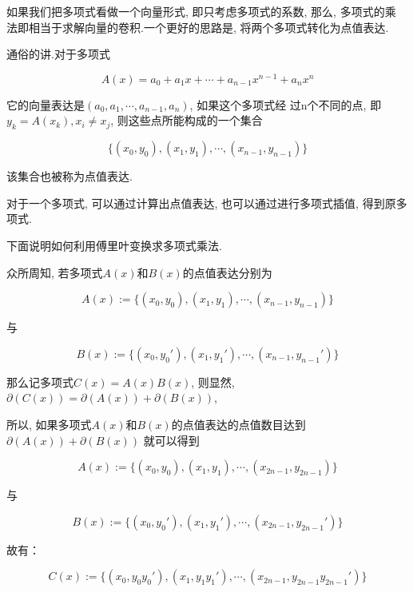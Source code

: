 如果我们把多项式看做一个向量形式, 即只考虑多项式的系数, 那么, 多项式的乘
法即相当于求解向量的卷积.一个更好的思路是, 将两个多项式转化为点值表达.

通俗的讲.对于多项式

\begin{equation}
A(x) = a_{0} + a_{1}x + \cdots + a_{n-1}x^{n-1} + a_{n}x^{n}
\end{equation}

它的向量表达是$(a_{0},  a_{1}, \cdots , a_{n-1}, a_{n})$, 如果这个多项式经
过n个不同的点, 即$y_k = A(x_k), x_i \neq x_j$, 则这些点所能构成的一个集合

\begin{equation}
\{(x_0, y_0), (x_1, y_1), \cdots , (x_{n - 1}, y_{n - 1})\}
\end{equation}

该集合也被称为点值表达.

对于一个多项式, 可以通过计算出点值表达, 也可以通过进行多项式插值, 得到原多项式.

下面说明如何利用傅里叶变换求多项式乘法.

众所周知, 若多项式$A(x)$和$B(x)$的点值表达分别为

\begin{equation}
A(x) := \{(x_0, y_0), (x_1, y_1), \cdots , (x_{n - 1}, y_{n - 1})\}
\end{equation}

与

\begin{equation}
B(x) := \{(x_0, {y_0}'), (x_1, {y_1}'), \cdots , (x_{n - 1}, {y_{n - 1}}')\}
\end{equation}

那么记多项式$C(x) = A(x)B(x)$, 则显然, $\partial (C(x)) = \partial (A(x)) + \partial (B(x))$, 

所以, 如果多项式$A(x)$和$B(x)$的点值表达的点值数目达到$\partial (A(x)) + \partial (B(x))$
就可以得到

\begin{equation}
A(x) := \{(x_0, y_0), (x_1, y_1), \cdots , (x_{2n - 1}, y_{2n - 1})\}
\end{equation}

与

\begin{equation}
B(x) := \{(x_0, {y_0}'), (x_1, {y_1}'), \cdots , (x_{2n - 1}, {y_{2n - 1}}')\}
\end{equation}

故有：

\begin{equation}
C(x) := \{(x_0, y_0{y_0}'), (x_1, y_1{y_1}'), \cdots , (x_{2n - 1}, y_{2n - 1}{y_{2n - 1}}')\}
\end{equation}

